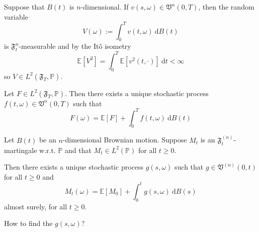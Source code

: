 Suppose that $B(t)$ is $n$-dimensional. If $v(s, \omega) \in \mathfrak{V}^n(0,T)$, then the random variable
\begin{equation*}
    V(\omega) := \int_0^T v(t, \omega) ~\mathrm{d}B(t)
\end{equation*}
is $\mathfrak{F}_t^n$-measurable and by the Itô isometry
\begin{equation*}
    \mathbb{E}[V^2] = \int_0^T \mathbb{E}[v^2(t, \cdot)] ~\mathrm{d}t < \infty
\end{equation*}
so $V \in L^2(\mathfrak{F}_T, \mathbb{P})$.

\begin{theorem}
    Let $F \in L^2(\mathfrak{F}_T, \mathbb{P})$. Then there exists a unique stochastic process $f(t, \omega) \in \mathfrak{V}^n(0, T)$ such that
    \begin{equation*}
        F(\omega) = \mathbb{E}[F] + \int_0^T f(t, \omega) ~\mathrm{d}B(t)
    \end{equation*}
\end{theorem}

\begin{theorem}
    Let $B(t)$ be an $n$-dimensional Brownian motion. Suppose $M_t$ is an $\mathfrak{F}_t^{(n)}$-martingale w.r.t. $\mathbb{P}$ and that $M_t \in L^2(\mathbb{P})$ for all $t \geq 0$.

    Then there exists a unique stochastic process $g(s, \omega)$ such that $g \in \mathfrak{V}^{(n)}(0, t)$ for all $t \geq 0$ and 
    \begin{equation*}
        M_t(\omega) = \mathbb{E}[M_0] + \int_0^t g(s, \omega) ~\mathrm{d}B(s)
    \end{equation*}
    almost surely, for all $t \geq 0$.
\end{theorem}

How to find the $g(s, \omega)$? 

